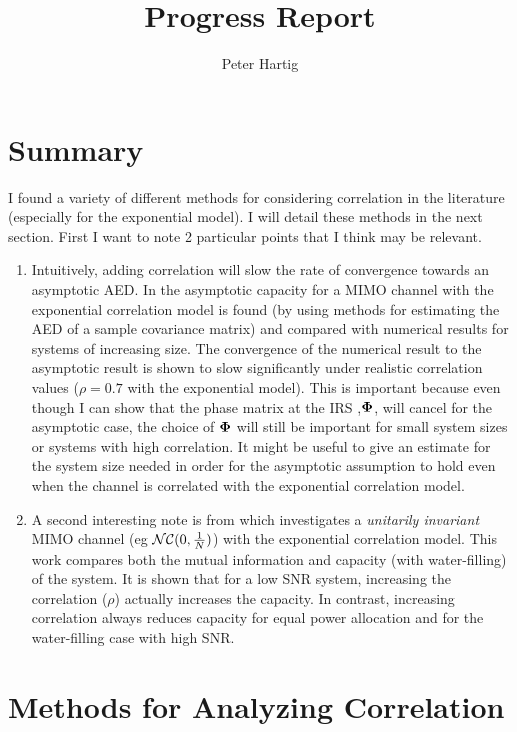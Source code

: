 \documentclass[12pt,a4paper]{report}
\title{Progress Report}
\author{Peter Hartig}
\begin{document}
\maketitle
\tableofcontents

\section{Summary}
I found a variety of different methods for considering correlation in the literature (especially for the exponential model). I will detail these methods in the next section. First I want to note 2 particular points that I think may be relevant. 
\begin{enumerate}
\item
	Intuitively, adding correlation will slow the rate of convergence towards an asymptotic AED. 
	In \cite[Fig. 2]{martin2004asymptotic} the asymptotic capacity for a MIMO channel with the exponential correlation model is found (by  using methods for estimating the AED of a sample covariance matrix) and compared with numerical results for systems of increasing size. The convergence of the numerical result to the asymptotic result is shown to slow significantly under realistic correlation values ($\rho = 0.7$ with the exponential model). This is important because even though I can show that the phase matrix at the IRS ,$\boldsymbol{\Phi}$, will cancel for the asymptotic case, the choice of $\boldsymbol{\Phi}$ will still be important for small system sizes or systems with high correlation.
	It  might be useful to give an estimate for the system size needed in order for the asymptotic assumption to hold even when the channel is correlated with the exponential correlation model.
	
\item	
	A second interesting note is from \cite{chuah2002capacity} which investigates a \emph{unitarily invariant} MIMO channel (eg $\mathcal{NC}(0,\frac{1}{N})$) with the exponential correlation model. 
	This work compares both the mutual information and capacity (with water-filling) of the system. It is shown that for a low SNR system, increasing the correlation ($\rho$)
	actually increases the capacity. In contrast, increasing correlation always reduces capacity for equal power allocation and for the water-filling case with high SNR. 
		
\end{enumerate}
\section{Methods for Analyzing Correlation}
\end{document}
